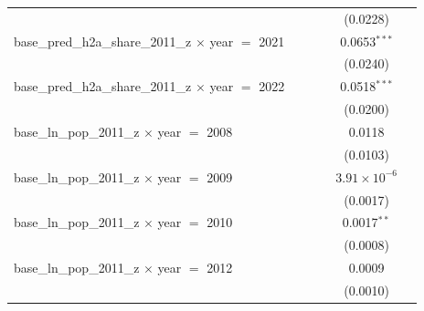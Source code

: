 \begin{tabular}{lccccc}
                                                                &                    &                 &                       & (0.0228)                   &   \\   
   base\_pred\_h2a\_share\_2011\_z $\times$ year $=$ 2021       &                    &                 &                       & 0.0653$^{***}$             &   \\   
                                                                &                    &                 &                       & (0.0240)                   &   \\   
   base\_pred\_h2a\_share\_2011\_z $\times$ year $=$ 2022       &                    &                 &                       & 0.0518$^{***}$             &   \\   
                                                                &                    &                 &                       & (0.0200)                   &   \\   
   base\_ln\_pop\_2011\_z $\times$ year $=$ 2008                &                    &                 &                       & 0.0118                     &   \\   
                                                                &                    &                 &                       & (0.0103)                   &   \\   
   base\_ln\_pop\_2011\_z $\times$ year $=$ 2009                &                    &                 &                       & $3.91\times 10^{-6}$       &   \\   
                                                                &                    &                 &                       & (0.0017)                   &   \\   
   base\_ln\_pop\_2011\_z $\times$ year $=$ 2010                &                    &                 &                       & 0.0017$^{**}$              &   \\   
                                                                &                    &                 &                       & (0.0008)                   &   \\   
   base\_ln\_pop\_2011\_z $\times$ year $=$ 2012                &                    &                 &                       & 0.0009                     &   \\   
                                                                &                    &                 &                       & (0.0010)                   &   \\   

\end{tabular}
